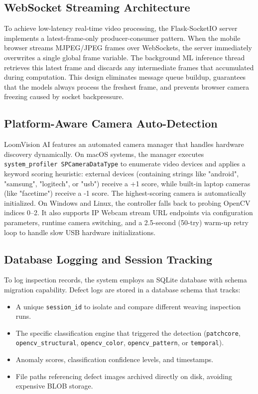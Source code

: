 \documentclass{ieeeaccess}
\begin{document}
\subsection{WebSocket Streaming Architecture}
To achieve low-latency real-time video processing, the Flask-SocketIO server implements a latest-frame-only producer-consumer pattern. When the mobile browser streams MJPEG/JPEG frames over WebSockets, the server immediately overwrites a single global frame variable. The background ML inference thread retrieves this latest frame and discards any intermediate frames that accumulated during computation. This design eliminates message queue buildup, guarantees that the models always process the freshest frame, and prevents browser camera freezing caused by socket backpressure.

\subsection{Platform-Aware Camera Auto-Detection}
LoomVision AI features an automated camera manager that handles hardware discovery dynamically. On macOS systems, the manager executes \texttt{system\_profiler SPCameraDataType} to enumerate video devices and applies a keyword scoring heuristic: external devices (containing strings like "android", "samsung", "logitech", or "usb") receive a +1 score, while built-in laptop cameras (like "facetime") receive a -1 score. The highest-scoring camera is automatically initialized. On Windows and Linux, the controller falls back to probing OpenCV indices 0--2. It also supports IP Webcam stream URL endpoints via configuration parameters, runtime camera switching, and a 2.5-second (50-try) warm-up retry loop to handle slow USB hardware initializations.

\subsection{Database Logging and Session Tracking}
To log inspection records, the system employs an SQLite database with schema migration capability. Defect logs are stored in a database schema that tracks:
\begin{itemize}
    \item A unique \texttt{session\_id} to isolate and compare different weaving inspection runs.
    \item The specific classification engine that triggered the detection (\texttt{patchcore}, \texttt{opencv\_structural}, \texttt{opencv\_color}, \texttt{opencv\_pattern}, or \texttt{temporal}).
    \item Anomaly scores, classification confidence levels, and timestamps.
    \item File paths referencing defect images archived directly on disk, avoiding expensive BLOB storage.
\end{itemize}
\end{document}
